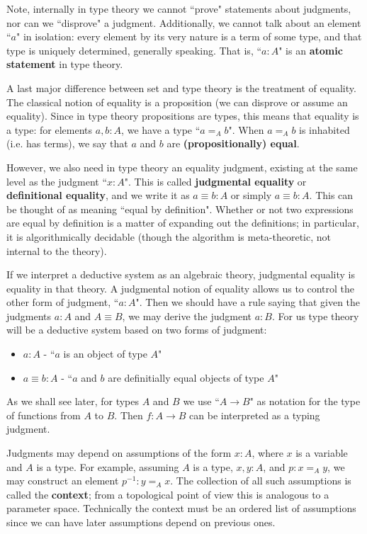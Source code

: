 Note, internally in type theory we cannot ``prove" statements about judgments, nor can we ``disprove" a judgment. Additionally, we cannot talk about an element ``$a$" in isolation: every element by its very nature is a term of some type, and that type is uniquely determined, generally speaking. That is, ``$a:A$" is an \textbf{atomic statement} in type theory.

A last major difference between set and type theory is the treatment of equality. The classical notion of equality is a proposition (we can disprove or assume an equality). Since in type theory propositions are types, this means that equality is a type: for elements $a,b:A$, we have a type ``$a=_Ab$". When $a=_Ab$ is inhabited (i.e. has terms), we say that $a$ and $b$ are \textbf{(propositionally) equal}.

However, we also need in type theory an equality judgment, existing at the same level as the judgment ``$x:A$". This is called \textbf{judgmental equality} or \textbf{definitional equality}, and we write it as $a \equiv b:A$ or simply $a\equiv b:A$. This can be thought of as meaning ``equal by definition". Whether or not two expressions are equal by definition is a matter of expanding out the definitions; in particular, it is algorithmically decidable (though the algorithm is meta-theoretic, not internal to the theory).

If we interpret a deductive system as an algebraic theory, judgmental equality is equality in that theory. A judgmental notion of equality allows us to control the other form of judgment, ``$a:A$". Then we should have a rule saying that given the judgments $a:A$ and $A\equiv B$, we may derive the judgment $a:B$. For us type theory will be a deductive system based on two forms of judgment: \begin{itemize}
    \item $a:A$ - ``$a$ is an object of type $A$"
    \item $a\equiv b:A$ - ``$a$ and $b$ are definitially equal objects of type $A$"
\end{itemize}
As we shall see later, for types $A$ and $B$ we use ``$A\rightarrow B$" as notation for the type of functions from $A$ to $B$. Then $f:A\rightarrow B$ can be interpreted as a typing judgment.

Judgments may depend on assumptions of the form $x:A$, where $x$ is a variable and $A$ is a type. For example, assuming $A$ is a type, $x,y :A$, and $p:x=_Ay$, we may construct an element $p^{-1}:y=_Ax$. The collection of all such assumptions is called the \textbf{context}; from a topological point of view this is analogous to a parameter space. Technically the context must be an ordered list of assumptions since we can have later assumptions depend on previous ones.

